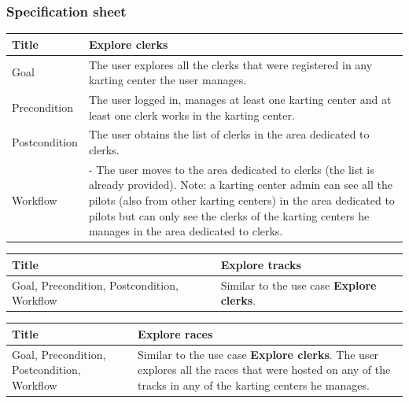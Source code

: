 \documentclass{beamer}
\begin{document}
\begin{frame}
    \frametitle{Specification sheet}
    \begin{table}
        \tiny
        \begin{tabular}{|p{2cm}|p{6cm}|}
        \hline  
        Title & \textbf{Explore clerks} \\
        \hline
        Goal & The user explores all the clerks that were registered in any karting center the user manages. \\
        \hline
        Precondition & The user logged in, manages at least one karting center and at least one clerk
        works in the karting center.\\
        \hline
        Postcondition & The user obtains the list of clerks in the area dedicated to clerks. \\
        \hline
        Workflow &
        - The user moves to the area dedicated to clerks (the list is already provided).
        Note: a karting center admin can see all the pilots (also from other karting centers) in the
        area dedicated to pilots but can only see the clerks of the karting centers he manages in the
        area dedicated to clerks. \\
        \hline
        \end{tabular}
\end{table}

\begin{table}
    \tiny
    \begin{tabular}{|p{2cm}|p{6cm}|}
    \hline  
    Title & \textbf{Explore tracks} \\
    \hline
    Goal, Precondition, Postcondition, Workflow & Similar to the use case \textbf{Explore clerks}. \\
    \hline
    \end{tabular}
\end{table}

\begin{table}
    \tiny
    \begin{tabular}{|p{2cm}|p{6cm}|}
    \hline  
    Title & \textbf{Explore races} \\
    \hline
    Goal, Precondition, Postcondition, Workflow & Similar to the use case \textbf{Explore clerks}.
    The user explores all the races that were hosted on any of the tracks in any of the karting centers
    he manages.\\
    \hline
    \end{tabular}
\end{table}
\end{frame}
\end{document}
